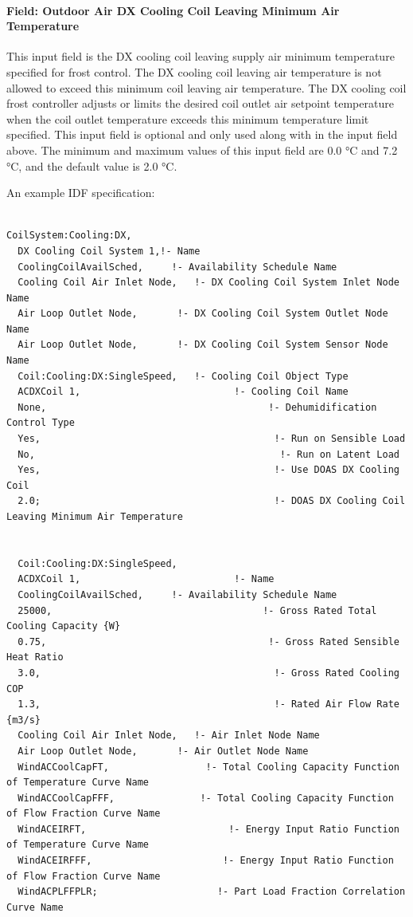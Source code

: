 \paragraph{Field: Outdoor Air DX Cooling Coil Leaving Minimum Air Temperature}\label{field-outdoor-air-dx-cooling-coil-leaving-minimum-air-temperature}

This input field is the DX cooling coil leaving supply air minimum temperature specified for frost control. The DX cooling coil leaving air temperature is not allowed to exceed this minimum coil leaving air temperature. The DX cooling coil frost controller adjusts or limits the desired coil outlet air setpoint temperature when the coil outlet temperature exceeds this minimum temperature limit specified. This input field is optional and only used along with in the input field above. The minimum and maximum values of this input field are 0.0 °C and 7.2 °C, and the default value is 2.0 °C.

An example IDF specification:

\begin{lstlisting}

CoilSystem:Cooling:DX,
  DX Cooling Coil System 1,!- Name
  CoolingCoilAvailSched,     !- Availability Schedule Name
  Cooling Coil Air Inlet Node,   !- DX Cooling Coil System Inlet Node Name
  Air Loop Outlet Node,       !- DX Cooling Coil System Outlet Node Name
  Air Loop Outlet Node,       !- DX Cooling Coil System Sensor Node Name
  Coil:Cooling:DX:SingleSpeed,   !- Cooling Coil Object Type
  ACDXCoil 1,                           !- Cooling Coil Name
  None,                                       !- Dehumidification Control Type
  Yes,                                         !- Run on Sensible Load
  No,                                           !- Run on Latent Load
  Yes,                                         !- Use DOAS DX Cooling Coil
  2.0;                                         !- DOAS DX Cooling Coil Leaving Minimum Air Temperature


  Coil:Cooling:DX:SingleSpeed,
  ACDXCoil 1,                           !- Name
  CoolingCoilAvailSched,     !- Availability Schedule Name
  25000,                                     !- Gross Rated Total Cooling Capacity {W}
  0.75,                                       !- Gross Rated Sensible Heat Ratio
  3.0,                                         !- Gross Rated Cooling COP
  1.3,                                         !- Rated Air Flow Rate {m3/s}
  Cooling Coil Air Inlet Node,   !- Air Inlet Node Name
  Air Loop Outlet Node,       !- Air Outlet Node Name
  WindACCoolCapFT,                 !- Total Cooling Capacity Function of Temperature Curve Name
  WindACCoolCapFFF,               !- Total Cooling Capacity Function of Flow Fraction Curve Name
  WindACEIRFT,                         !- Energy Input Ratio Function of Temperature Curve Name
  WindACEIRFFF,                       !- Energy Input Ratio Function of Flow Fraction Curve Name
  WindACPLFFPLR;                     !- Part Load Fraction Correlation Curve Name
\end{lstlisting}

